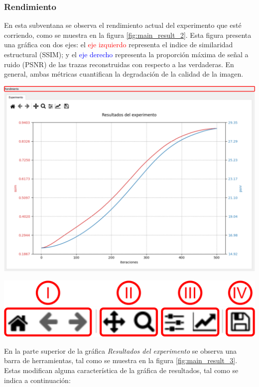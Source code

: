 \documentclass[12pt,twoside,letter]{ol-softwaremanual}
\newenvironment{Figure}
  {\par\medskip\noindent\minipage{\linewidth}}
  {\endminipage\par\medskip}
\begin{document}
\subsubsection{Rendimiento}

En esta subventana se observa el rendimiento actual del experimento que esté corriendo, como se muestra en la figura \ref{fig:main_result_2}. Esta figura presenta una gráfica con dos ejes: el \textcolor{red}{eje izquierdo} representa el indice de similaridad estructural (SSIM); y el \textcolor{blue}{eje derecho} representa la proporción máxima de señal a ruido (PSNR) de las trazas reconstruidas con respecto a las verdaderas. En general, ambas métricas cuantifican la degradación de la calidad de la imagen.

\begin{Figure}
	\centering
	\includegraphics[width=0.8\linewidth]{main-result-2.png}
	\label{fig:main_result_2}
\end{Figure}

\begin{multicols}{2}

\begin{Figure}
	\vspace{0.7cm}
	\centering
	\includegraphics[width=0.9\linewidth]{main-result-3.png}
	\label{fig:main_result_3}
\end{Figure}

En la parte superior de la gráfica \textit{Resultados del experimento} se observa una barra de herramientas, tal como se muestra en la figura \ref{fig:main_result_3}. Estas modifican alguna característica de la gráfica de resultados, tal como se indica a continuación:

\end{multicols}
\end{document}
